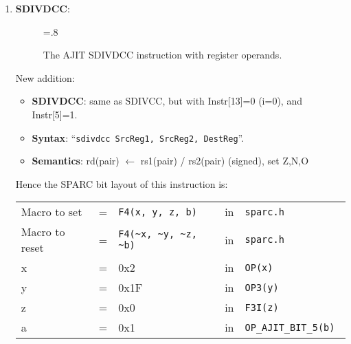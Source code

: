 \begin{enumerate}
\item \textbf{SDIVDCC}:\\
  \begin{center}
    \begin{figure}[h]
      \centering
      \epsfxsize=.8\linewidth
      \caption{The AJIT SDIVDCC instruction  with register operands.}
      \label{fig:ajit:sdivdcc:insn}
    \end{figure}
  \end{center}
  New addition:
  \begin{itemize}
  \item []\textbf{SDIVDCC}: same as SDIVCC, but with Instr[13]=0 (i=0), and
    Instr[5]=1.
  \item []\textbf{Syntax}: ``\texttt{sdivdcc  SrcReg1, SrcReg2, DestReg}''.
  \item []\textbf{Semantics}: rd(pair) $\leftarrow$ rs1(pair) /
    rs2(pair) (signed), set Z,N,O
  \end{itemize}

  Hence the SPARC bit layout of this instruction is:

  \begin{tabular}[h]{lclcl}
    Macro to set   &=& \verb|F4(x, y, z, b)|     &in& \verb|sparc.h|           \\
    Macro to reset &=& \verb|F4(~x, ~y, ~z, ~b)| &in& \verb|sparc.h|           \\
    x              &=& 0x2                       &in& \verb|OP(x) |            \\
    y              &=& 0x1F                      &in& \verb|OP3(y) |           \\
    z              &=& 0x0                       &in& \verb|F3I(z) |           \\
    a              &=& 0x1                       &in& \verb|OP_AJIT_BIT_5(b) |
  \end{tabular}
\end{enumerate}

